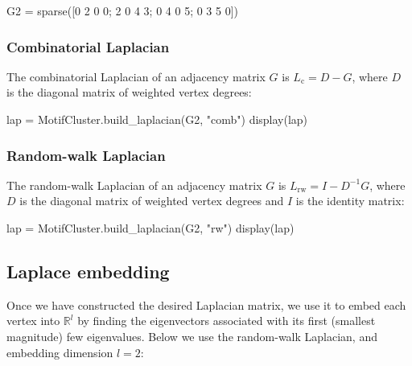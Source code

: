 \documentclass{article}
\begin{document}
\begin{tcolorbox}[colback=black!5!white,colframe=black!15!white]
\begin{juliablock}
G2 = sparse([0 2 0 0; 2 0 4 3; 0 4 0 5; 0 3 5 0])
\end{juliablock}
\end{tcolorbox}

\subsubsection{Combinatorial Laplacian}

The combinatorial Laplacian of an adjacency matrix $G$ is
$L_\mathrm{c} = D - G$,
where $D$ is the diagonal matrix of weighted vertex degrees:

\begin{tcolorbox}[colback=black!5!white,colframe=black!15!white]
\begin{juliablock}
lap = MotifCluster.build_laplacian(G2, "comb")
display(lap)
\end{juliablock}
\texttt{\obeylines\printpythontex}
\end{tcolorbox}

\subsubsection{Random-walk Laplacian}

The random-walk Laplacian of an adjacency matrix $G$ is
$L_\mathrm{rw} = I - D^{-1}G$,
where $D$ is the diagonal matrix of weighted vertex degrees
and $I$ is the identity matrix:

\begin{tcolorbox}[colback=black!5!white,colframe=black!15!white]
\begin{juliablock}
lap = MotifCluster.build_laplacian(G2, "rw")
display(lap)
\end{juliablock}
\texttt{\obeylines\printpythontex}
\end{tcolorbox}

\subsection{Laplace embedding}

Once we have constructed the desired Laplacian matrix,
we use it to embed each vertex into $\mathbb{R}^l$
by finding the eigenvectors associated with
its first (smallest magnitude) few eigenvalues.
Below we use the random-walk Laplacian,
and embedding dimension $l=2$:
\end{document}
